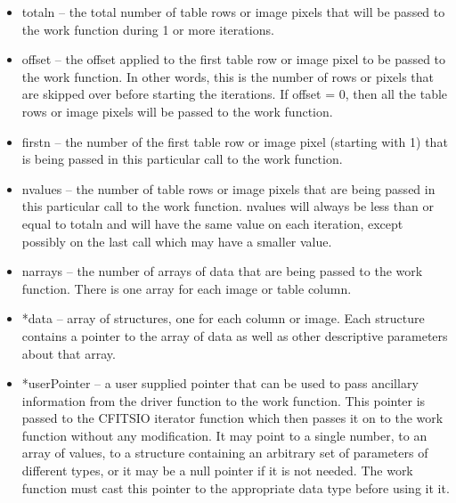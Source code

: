 \documentclass[11pt]{book}
\begin{document}
\begin{itemize}

\item
  totaln -- the total number of table rows or image pixels
            that will be passed to the work function
            during 1 or more iterations.

\item
  offset     -- the offset applied to the first table row or image
                pixel to be passed to the work function.  In other
                words, this is the number of rows or pixels that
                are skipped over before starting the iterations. If
                offset = 0, then all the table rows or image pixels
                will be passed to the work function.

\item
  firstn     -- the number of the first table row or image pixel
                (starting with 1)  that is being passed in this
                particular call to the work function.

\item
  nvalues    -- the number of table rows or image pixels that are
                being passed in this particular call to the work
                function.  nvalues will always be less than or
                equal to totaln and will have the same value on
                each iteration, except possibly on the last
                call which may have a smaller value.

\item
  narrays     -- the number of arrays of data that are being passed
                 to the work function.  There is one array for each
                 image or table column.

\item
  *data   -- array of structures, one for each
             column or image.  Each structure contains a pointer
             to the array of data as well as other descriptive
             parameters about that array.

\item
  *userPointer -- a user supplied pointer that can be used
                 to pass ancillary information from the driver function
                 to the work function.
                 This pointer is passed to the CFITSIO iterator function
                 which then passes it on to the
                 work function without any modification.
                 It may point to a single number, to an array of values,
                 to a structure containing an arbitrary set of parameters
                 of different types,
                 or it may be a null pointer if it is not needed.
                 The work function must cast this pointer to the
                 appropriate data type before using it it.
\end{itemize}
\end{document}
